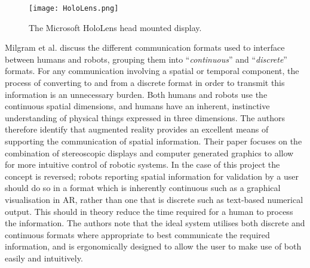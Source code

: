 \begin{figure}
	\begin{center}
	\texttt{[image: HoloLens.png]}
	\decoRule
	\caption[Microsoft HoloLens. ]{The Microsoft HoloLens head mounted display.}
	\label{fig:HoloLens}
	\end{center}
\end{figure}

Milgram et al. \cite{Milgram:1993} discuss the different communication formats used to interface between humans and robots, grouping them into ``\textit{continuous}'' and ``\textit{discrete}'' formats. For any communication involving a spatial or temporal component, the process of converting to and from a discrete format in order to transmit this information is an unnecessary burden. Both humans and robots use the continuous spatial dimensions, and humans have an inherent, instinctive understanding of physical things expressed in three dimensions. The authors \cite{Milgram:1993} therefore identify that  augmented reality provides an excellent means of supporting the communication of spatial information. Their paper focuses on the combination of stereoscopic displays and computer generated graphics to allow for more intuitive control of robotic systems. In the case of this project the concept is reversed; robots reporting spatial information for validation by a user should do so in a format which is inherently continuous such as a graphical visualisation in AR, rather than one that is discrete such as text-based numerical output. This should in theory reduce the time required for a human to process the information. The authors note \cite{Milgram:1993} that the ideal system utilises both discrete and continuous formats where appropriate to best communicate the required information, and is ergonomically designed to allow the user to make use of both easily and intuitively.


